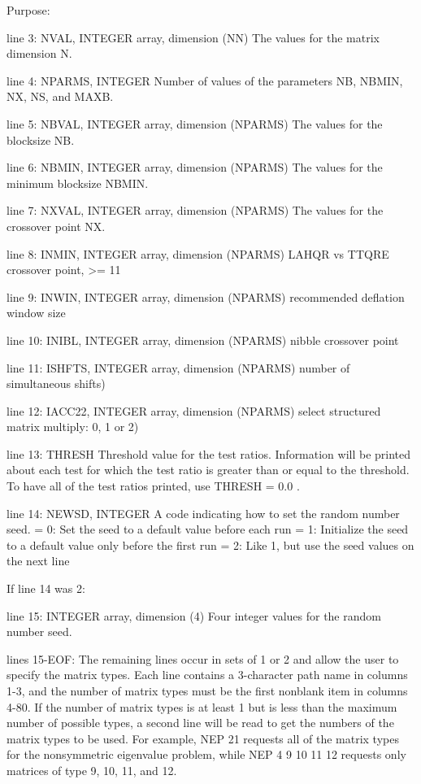 \begin{DoxyParagraph}{Purpose\+: }
\begin{DoxyVerb}
 line 3:  NVAL, INTEGER array, dimension (NN)
          The values for the matrix dimension N.

 line 4:  NPARMS, INTEGER
          Number of values of the parameters NB, NBMIN, NX, NS, and
          MAXB.

 line 5:  NBVAL, INTEGER array, dimension (NPARMS)
          The values for the blocksize NB.

 line 6:  NBMIN, INTEGER array, dimension (NPARMS)
          The values for the minimum blocksize NBMIN.

 line 7:  NXVAL, INTEGER array, dimension (NPARMS)
          The values for the crossover point NX.

 line 8:  INMIN, INTEGER array, dimension (NPARMS)
          LAHQR vs TTQRE crossover point, >= 11

 line 9:  INWIN, INTEGER array, dimension (NPARMS)
          recommended deflation window size

 line 10: INIBL, INTEGER array, dimension (NPARMS)
          nibble crossover point

 line 11: ISHFTS, INTEGER array, dimension (NPARMS)
          number of simultaneous shifts)

 line 12: IACC22, INTEGER array, dimension (NPARMS)
          select structured matrix multiply: 0, 1 or 2)

 line 13: THRESH
          Threshold value for the test ratios.  Information will be
          printed about each test for which the test ratio is greater
          than or equal to the threshold.  To have all of the test
          ratios printed, use THRESH = 0.0 .

 line 14: NEWSD, INTEGER
          A code indicating how to set the random number seed.
          = 0:  Set the seed to a default value before each run
          = 1:  Initialize the seed to a default value only before the
                first run
          = 2:  Like 1, but use the seed values on the next line

 If line 14 was 2:

 line 15: INTEGER array, dimension (4)
          Four integer values for the random number seed.

 lines 15-EOF:  The remaining lines occur in sets of 1 or 2 and allow
          the user to specify the matrix types.  Each line contains
          a 3-character path name in columns 1-3, and the number
          of matrix types must be the first nonblank item in columns
          4-80.  If the number of matrix types is at least 1 but is
          less than the maximum number of possible types, a second
          line will be read to get the numbers of the matrix types to
          be used.  For example,
 NEP 21
          requests all of the matrix types for the nonsymmetric
          eigenvalue problem, while
 NEP  4
 9 10 11 12
          requests only matrices of type 9, 10, 11, and 12.


\end{DoxyVerb}
\end{DoxyParagraph}
